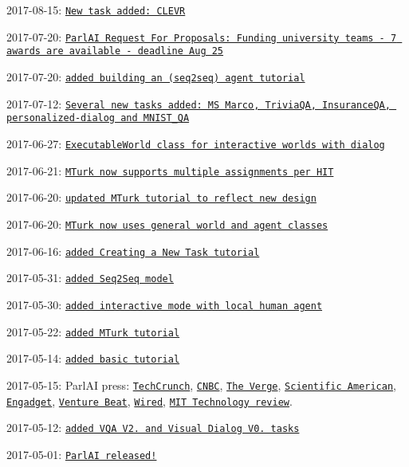 2017-\/08-\/15\+: \href{https://github.com/facebookresearch/ParlAI/blob/master/parlai/tasks/task_list.py}{\tt New task added\+: C\+L\+E\+VR}

2017-\/07-\/20\+: \href{https://research.fb.com/programs/research-awards/proposals/parlai/}{\tt Parl\+AI Request For Proposals\+: Funding university teams -\/ 7 awards are available -\/ deadline Aug 25}

2017-\/07-\/20\+: \href{http://www.parl.ai/static/docs/seq2seq_tutorial.html}{\tt added building an (seq2seq) agent tutorial}

2017-\/07-\/12\+: \href{https://github.com/facebookresearch/ParlAI/blob/master/parlai/tasks/task_list.py}{\tt Several new tasks added\+: MS Marco, Trivia\+QA, Insurance\+QA, personalized-\/dialog and M\+N\+I\+S\+T\+\_\+\+QA}

2017-\/06-\/27\+: \href{https://github.com/facebookresearch/ParlAI/pull/170}{\tt Executable\+World class for interactive worlds with dialog}

2017-\/06-\/21\+: \href{https://github.com/facebookresearch/ParlAI/pull/156}{\tt M\+Turk now supports multiple assignments per H\+IT}

2017-\/06-\/20\+: \href{http://parl.ai/static/docs/mturk.html}{\tt updated M\+Turk tutorial to reflect new design}

2017-\/06-\/20\+: \href{https://github.com/facebookresearch/ParlAI/pull/128}{\tt M\+Turk now uses general world and agent classes}

2017-\/06-\/16\+: \href{http://parl.ai/static/docs/task_tutorial.html}{\tt added Creating a New Task tutorial}

2017-\/05-\/31\+: \href{https://github.com/facebookresearch/ParlAI/pull/96}{\tt added Seq2\+Seq model}

2017-\/05-\/30\+: \href{https://github.com/facebookresearch/ParlAI/pull/110}{\tt added interactive mode with local human agent}

2017-\/05-\/22\+: \href{http://parl.ai/static/docs/mturk.html}{\tt added M\+Turk tutorial}

2017-\/05-\/14\+: \href{http://parl.ai/static/docs/basic_tutorial.html}{\tt added basic tutorial}

2017-\/05-\/15\+: Parl\+AI press\+: \href{https://techcrunch.com/2017/05/15/facebooks-parlai-is-where-researchers-will-push-the-boundaries-of-conversational-ai/}{\tt Tech\+Crunch}, \href{http://www.cnbc.com/2017/05/12/facebook-releases-parlai-to-speed-realistic-chat-bot-development.html}{\tt C\+N\+BC}, \href{https://www.theverge.com/2017/5/15/15640886/facebook-parlai-chatbot-research-ai-chatbot}{\tt The Verge}, \href{https://www.scientificamerican.com/article/facebook-wants-to-make-chatbots-more-conversational/}{\tt Scientific American}, \href{https://www.engadget.com/2017/05/15/facebook-parlAI-chatbot-training/}{\tt Engadget}, \href{https://venturebeat.com/2017/05/15/facebook-to-launch-parlai-a-testing-ground-for-ai-and-bots/}{\tt Venture Beat}, \href{https://www.wired.com/2017/05/inside-facebooks-training-ground-making-chatbots-chattier/}{\tt Wired}, \href{https://www.technologyreview.com/s/607854/facebook-wants-to-merge-ai-systems-for-a-smarter-chatbot/}{\tt M\+IT Technology review}.

2017-\/05-\/12\+: \href{https://github.com/facebookresearch/ParlAI/pull/54}{\tt added V\+QA V2. and Visual Dialog V0. tasks}

2017-\/05-\/01\+: \href{https://code.facebook.com/posts/266433647155520/parlai-a-new-software-platform-for-dialog-research/}{\tt Parl\+AI released!} 